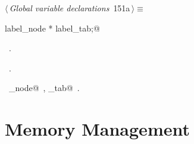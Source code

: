 \documentclass[a4paper]{report}
\begin{document}
\begin{flushleft} \small
\begin{minipage}{\linewidth}\label{scrap336}\raggedright\small
{} $\langle\,${\it Global variable declarations}\nobreak\ {\footnotesize {151a}}$\,\rangle\equiv$
\vspace{-1ex}
\begin{list}{}{} \item
\mbox{}\verb@extern label_node * label_tab;@\\
\mbox{}\verb@@{\NWsep}
\end{list}
\vspace{-1.5ex}
\footnotesize
\begin{list}{}{\setlength{\itemsep}{-\parsep}\setlength{\itemindent}{-\leftmargin}}
\item \NWtxtMacroDefBy\ .
\item \NWtxtMacroRefIn\ .
\item \NWtxtIdentsUsed\nobreak\  \verb@label_node@\nobreak\ , \verb@label_tab@\nobreak\ .
\item{}
\end{list}
\end{minipage}\vspace{4ex}
\end{flushleft}
\section{Memory Management} \label{memory-management}
\end{document}
